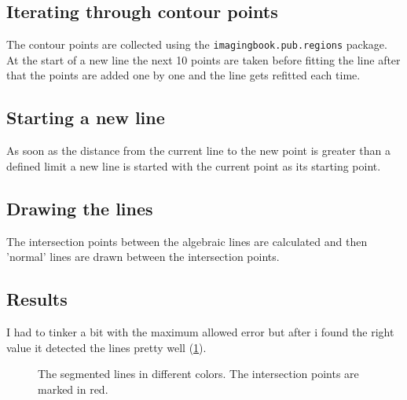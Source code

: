 \subsection{Iterating through contour points}
The contour points are collected using the \texttt{imagingbook.pub.regions} package. At the start of a new line the next 10 points are taken before fitting the line after that the points are  added one by one and the line gets refitted each time.

\subsection{Starting a new line}
As soon as the distance from the current line to the new point is greater than a defined limit a new line is started with the current point as its starting point.

\subsection{Drawing the lines}
The intersection points between the algebraic lines are calculated and then 'normal' lines are drawn between the intersection points.

\subsection{Results}
I had to tinker a bit with the maximum allowed error but after i found the right value it detected the lines pretty well (\ref{fig:Result4_3}). 


\begin{figure}
	\centering
	\caption{The segmented lines in different colors. The intersection points are marked in red.}
	\label{fig:Result4_3}
\end{figure}






